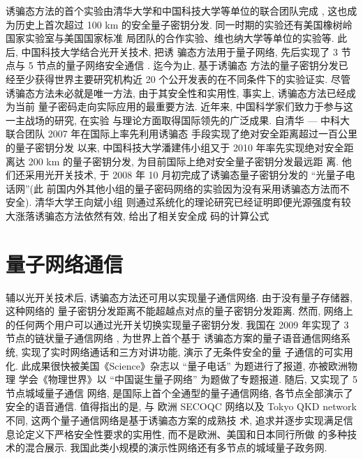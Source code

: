 诱骗态方法的首个实验由清华大学和中国科技大学等单位的联合团队完成 \cite{Peng2007}, 这也成为历史上首次超过 100 km 的安全量子密钥分发. 同一时期的实验还有美国橡树岭国家实验室与美国国家标准 局团队的合作实验、维也纳大学等单位的实验等. 此后, 中国科技大学结合光开关技术, 把诱 骗态方法用于量子网络, 先后实现了 3 节点与 5 节点的量子网络安全通信 \cite{Chen2009}. 迄今为止, 基于诱骗态 方法的量子密钥分发已经至少获得世界主要研究机构近 20 个公开发表的在不同条件下的实验证实. 尽管诱骗态方法未必就是唯一方法, 由于其安全性和实用性, 事实上, 诱骗态方法已经成为当前 量子密码走向实际应用的最重要方法. 近年来, 中国科学家们致力于参与这一主战场的研究, 在实验 与理论方面取得国际领先的广泛成果. 自清华 — 中科大联合团队 2007 年在国际上率先利用诱骗态 手段实现了绝对安全距离超过一百公里的量子密钥分发 \cite{Peng2007} 以来, 中国科技大学潘建伟小组又于 2010 年率先实现绝对安全距离达 200 km 的量子密钥分发, 为目前国际上绝对安全量子密钥分发最远距 离. 他们还采用光开关技术, 于 2008 年 10 月初完成了诱骗态量子密钥分发的 “光量子电话网”\cite{Chen2009}(此 前国内外其他小组的量子密码网络的实验因为没有采用诱骗态方法而不安全). 清华大学王向斌小组 则通过系统化的理论研究已经证明即便光源强度有较大涨落诱骗态方法依然有效, 给出了相关安全成 码的计算公式

\section{量子网络通信}
辅以光开关技术后, 诱骗态方法还可用以实现量子通信网络. 由于没有量子存储器, 这种网络的 量子密钥分发距离不能超越点对点的量子密钥分发距离. 然而, 网络上的任何两个用户可以通过光开关切换实现量子密钥分发. 我国在 2009 年实现了 3 节点的链状量子通信网络 \cite{Chen2009}, 为世界上首个基于 诱骗态方案的量子语音通信网络系统, 实现了实时网络通话和三方对讲功能, 演示了无条件安全的量 子通信的可实用化. 此成果很快被美国《Science》杂志以 “量子电话” 为题进行了报道, 亦被欧洲物理 学会《物理世界》以 “中国诞生量子网络” 为题做了专题报道. 随后, 又实现了 5 节点城域量子通信 网络\cite{Chen2010}, 是国际上首个全通型的量子通信网络, 各节点全部演示了安全的语音通信. 值得指出的是, 与 欧洲 SECOQC 网络以及 Tokyo QKD network 不同, 这两个量子通信网络是基于诱骗态方案的成熟技 术, 追求并逐步实现满足信息论定义下严格安全性要求的实用性, 而不是欧洲、美国和日本同行所做 的多种技术的混合展示. 我国此类小规模的演示性网络还有多节点的城域量子政务网.